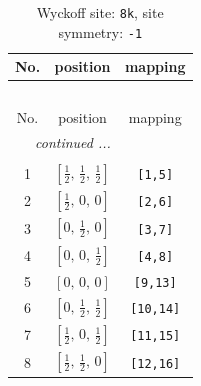 \documentclass[fleqn,8pt]{jsarticle}
\begin{document}
\renewcommand{\arraystretch}{1.2}
\begin{longtable}{ccc}
\caption{Wyckoff site: {\tt 8k}, site symmetry: {\tt -1}}
 \\
 \hline \hline
No. & position & mapping \\ \hline \endfirsthead

\multicolumn{2}{l}{\tablename\ \thetable{}} \\
 \hline \hline
No. & position & mapping \\ \hline \endhead

 \hline \hline
\multicolumn{2}{r}{\footnotesize\it continued ...} \\ \endfoot

 \hline \hline
\multicolumn{2}{r}{} \\ \endlastfoot

1 & $\left[ \frac{1}{2},\, \frac{1}{2},\, \frac{1}{2} \right]$ & {\tt [1,5]} \\ \hline
2 & $\left[ \frac{1}{2},\, 0,\, 0 \right]$ & {\tt [2,6]} \\ \hline
3 & $\left[ 0,\, \frac{1}{2},\, 0 \right]$ & {\tt [3,7]} \\ \hline
4 & $\left[ 0,\, 0,\, \frac{1}{2} \right]$ & {\tt [4,8]} \\ \hline
5 & $\left[ 0,\, 0,\, 0 \right]$ & {\tt [9,13]} \\ \hline
6 & $\left[ 0,\, \frac{1}{2},\, \frac{1}{2} \right]$ & {\tt [10,14]} \\ \hline
7 & $\left[ \frac{1}{2},\, 0,\, \frac{1}{2} \right]$ & {\tt [11,15]} \\ \hline
8 & $\left[ \frac{1}{2},\, \frac{1}{2},\, 0 \right]$ & {\tt [12,16]} \\
\end{longtable}
\renewcommand{\arraystretch}{1.2}
\end{document}
